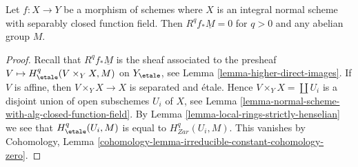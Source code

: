 \begin{lemma}
\label{lemma-Rf-star-zero-normal-with-alg-closed-function-field}
Let $f : X \to Y$ be a morphism of schemes where $X$ is an integral
normal scheme with separably closed function field. Then
$R^qf_*\underline{M} = 0$ for $q > 0$ and any abelian group $M$.
\end{lemma}

\begin{proof}
Recall that $R^qf_*\underline{M}$ is the sheaf associated
to the presheaf $V \mapsto H^q_\etale(V \times_Y X, M)$ on $Y_\etale$, see
Lemma \ref{lemma-higher-direct-images}.
If $V$ is affine, then $V \times_Y X \to X$ is separated and \'etale.
Hence $V \times_Y X = \coprod U_i$ is a disjoint union of open
subschemes $U_i$ of $X$, see
Lemma \ref{lemma-normal-scheme-with-alg-closed-function-field}.
By Lemma \ref{lemma-local-rings-strictly-henselian}
we see that $H^q_\etale(U_i, M)$ is equal to
$H^q_{Zar}(U_i, M)$. This vanishes by
Cohomology, Lemma \ref{cohomology-lemma-irreducible-constant-cohomology-zero}.
\end{proof}
